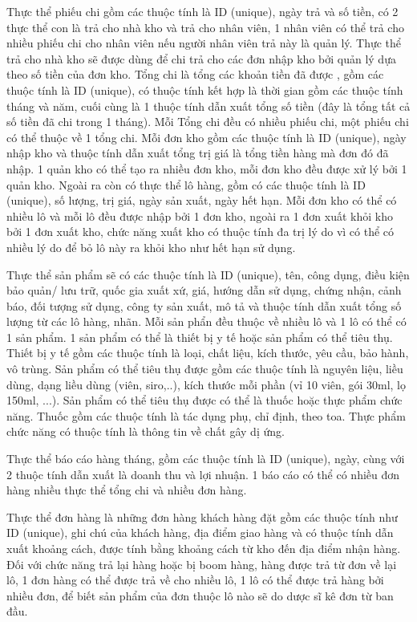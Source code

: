 Thực thể phiếu chi gồm các thuộc tính là ID (unique), ngày trả và số tiền, có 2 thực thể con là trả cho nhà kho và trả cho nhân viên, 1 nhân viên có thể trả cho nhiều phiếu chi cho nhân viên nếu người nhân viên trả này là quản lý. Thực thể trả cho nhà kho sẽ được dùng để chi trả cho các đơn nhập kho bởi quản lý dựa theo số tiền của đơn kho. Tổng chi là tổng các khoản tiền đã được , gồm các thuộc tính là ID (unique), có thuộc tính kết hợp là thời gian gồm các thuộc tính tháng và năm, cuối cùng là 1  thuộc tính dẫn xuất tổng số tiền (đây là tổng tất cả số tiền đã chi trong 1 tháng). Mỗi Tổng chi đều có nhiều phiếu chi, một phiếu chi có thể thuộc về 1 tổng chi. Mỗi đơn kho gồm các thuộc tính là ID (unique), ngày nhập kho và thuộc tính dẫn xuất tổng trị giá là tổng tiền hàng mà đơn đó đã nhập. 1 quản kho có thể tạo ra nhiều đơn kho, mỗi đơn kho đều được xử lý bởi 1 quản kho. Ngoài ra còn có thực thể lô hàng, gồm có các thuộc tính là ID (unique), số lượng, trị giá, ngày sản xuất, ngày hết hạn. Mỗi đơn kho có thể có nhiều lô và mỗi lô đều được nhập bởi 1 đơn kho, ngoài ra 1 đơn xuất khỏi kho bởi 1 đơn xuất kho, chức năng xuất kho có thuộc tính đa trị lý do vì có thể có nhiều lý do để bỏ lô này ra khỏi kho như hết hạn sử dụng.

Thực thể sản phẩm sẽ có các thuộc tính là ID (unique), tên, công dụng, điều kiện bảo quản/ lưu trữ, quốc gia xuất xứ, giá, hướng dẫn sử dụng, chứng nhận, cảnh báo, đối tượng sử dụng, công ty sản xuất, mô tả và thuộc tính dẫn xuất tổng số lượng từ các lô hàng, nhãn. Mỗi sản phẩn đều thuộc về nhiều lô và 1 lô có thể có 1 sản phẩm. 1 sản phẩm có thể là thiết bị y tế hoặc sản phẩm có thể tiêu thụ. Thiết bị y tế  gồm các thuộc tính là loại, chất liệu, kích thước, yêu cầu, bảo hành, vô trùng. Sản phẩm có thể tiêu thụ được gồm các thuộc tính là nguyên liệu, liều dùng, dạng liều dùng (viên, siro,..), kích thước mỗi phần (vỉ 10 viên, gói 30ml, lọ 150ml, ...). Sản phẩm có thể tiêu thụ được có thể là thuốc hoặc thực phẩm chức năng. Thuốc gồm các thuộc tính là tác dụng phụ, chỉ định, theo toa. Thực phẩm chức năng có thuộc tính là thông tin về chất gây dị ứng.

Thực thể báo cáo hàng tháng, gồm các thuộc tính là ID (unique), ngày, cùng với 2 thuộc tính dẫn xuất là doanh thu và lợi nhuận. 1 báo cáo có thể có nhiều đơn hàng nhiều thực thể tổng chi và nhiều đơn hàng.

Thực thể đơn hàng là những đơn hàng khách hàng đặt gồm các thuộc tính như ID (unique), ghi chú của khách hàng, địa điểm giao hàng và có thuộc tính dẫn xuất khoảng cách, được tính bằng khoảng cách từ kho đến địa điểm nhận hàng. Đối với chức năng trả lại hàng hoặc bị boom hàng, hàng được trả từ đơn về lại lô, 1 đơn hàng có thể được trả về cho nhiều lô, 1 lô có thể được trả hàng bởi nhiều đơn, để biết sản phẩm của đơn thuộc lô nào sẽ do dược sĩ kê đơn từ ban đầu.

